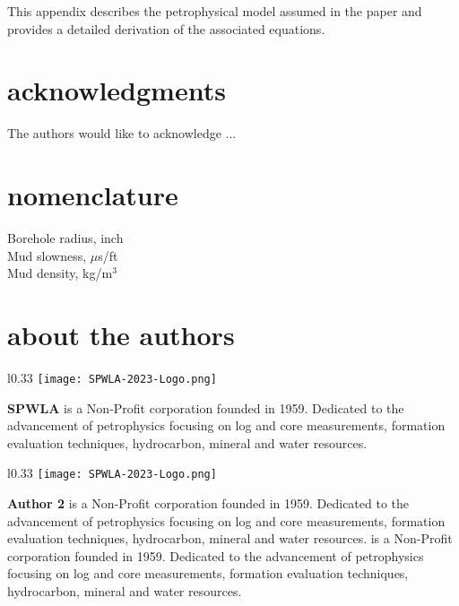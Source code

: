 \documentclass[10pt,twocolumn,twoside]{article}
\begin{document}
This appendix describes the petrophysical model assumed in the paper and provides a detailed derivation of the associated equations.

\section{acknowledgments}
The authors would like to acknowledge ...

\section{nomenclature}
  Borehole radius, inch\\
  Mud slowness, $\mu$s/ft\\
  Mud density, kg/m$^3$




\section{about the authors}
\setlength\intextsep{0pt}
\begin{wrapfigure}{l}{0.33\linewidth}
	\texttt{[image: SPWLA-2023-Logo.png]}
	\vspace{0.03in}
\end{wrapfigure}
\textbf{SPWLA} is a Non-Profit corporation founded in 1959. Dedicated to the advancement of petrophysics focusing on log and core measurements, formation evaluation techniques, hydrocarbon, mineral and water resources.

\begin{wrapfigure}{l}{0.33\linewidth}
	\texttt{[image: SPWLA-2023-Logo.png]}
	\vspace{0.03in}
\end{wrapfigure}
\textbf{Author 2} is a Non-Profit corporation founded in 1959. Dedicated to the advancement of petrophysics focusing on log and core measurements, formation evaluation techniques, hydrocarbon, mineral and water resources. is a Non-Profit corporation founded in 1959. Dedicated to the advancement of petrophysics focusing on log and core measurements, formation evaluation techniques, hydrocarbon, mineral and water resources.
\end{document}

